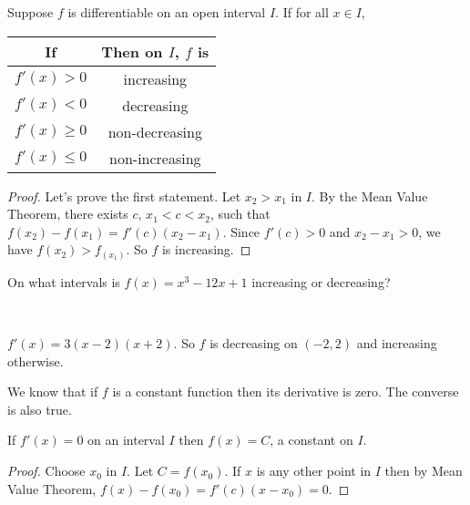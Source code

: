 \documentclass[../main.tex]{subfiles}
\begin{document}
  \begin{theorem}
    Suppose $f$ is differentiable on an open interval $I$. If for all $x \in I$,
    \begin{table}[H]
      \centering
      \begin{tabular}{|c|c|}
        \hline
        If & Then on $I$, $f$ is \\
        \hline
        $f'(x) > 0$ & increasing \\
        $f'(x) < 0$ & decreasing \\
        $f'(x) \ge 0$ & non-decreasing \\
        $f'(x) \le 0$ & non-increasing \\
        \hline
      \end{tabular}
    \end{table}

  \end{theorem}
  \begin{proof}
    Let's prove the first statement. Let $x_2 > x_1$ in $I$. By the Mean Value Theorem, there exists $c$, $x_1< c < x_2$, such that $f(x_2) - f(x_1) = f'(c) (x_2 - x_1)$. Since $f'(c)>0$  and $x_2-x_1>0$, we have $f(x_2) > f_(x_1)$. So $f$ is increasing.
  \end{proof}

  \begin{example}
    On what intervals is $f(x) = x^3 - 12 x + 1$ increasing or decreasing?
  \end{example}
  \begin{solution}
    ~\\
    \begin{minipage}{0.5\textwidth}
      $f'(x) = 3(x-2)(x+2)$. So $f$ is decreasing on $(-2, 2)$ and increasing otherwise.
    \end{minipage}%
    \begin{minipage}{0.5\textwidth}
      \begin{figure}[H]
        \centering
        
      \end{figure}
    \end{minipage}

  \end{solution}

  We know that if $f$ is a constant function then its derivative is zero. The converse is also true.
  \begin{theorem} \label{THM: functions with zero derivative are constant}
    If $f'(x) = 0$ on an interval $I$ then $f(x) = C$, a constant on $I$.
  \end{theorem}
  \begin{proof}
    Choose $x_0$ in $I$. Let $C = f(x_0)$. If $x$ is any other point in $I$ then by Mean Value Theorem, $f(x) - f(x_0) = f'(c) (x-x_0) = 0$.
  \end{proof}
\end{document}
